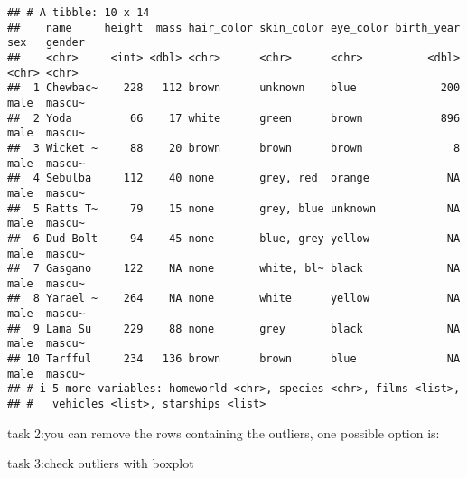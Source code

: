 \documentclass[
]{article}
\newenvironment{Shaded}{\begin{snugshade}}{\end{snugshade}}
\newcommand{\FunctionTok}[1]{\textcolor[rgb]{0.13,0.29,0.53}{\textbf{#1}}}
\newcommand{\NormalTok}[1]{#1}
\newcommand{\OtherTok}[1]{\textcolor[rgb]{0.56,0.35,0.01}{#1}}
\newcommand{\SpecialCharTok}[1]{\textcolor[rgb]{0.81,0.36,0.00}{\textbf{#1}}}
\begin{document}
\begin{Shaded}
\end{Shaded}

\begin{verbatim}
## # A tibble: 10 x 14
##    name     height  mass hair_color skin_color eye_color birth_year sex   gender
##    <chr>     <int> <dbl> <chr>      <chr>      <chr>          <dbl> <chr> <chr> 
##  1 Chewbac~    228   112 brown      unknown    blue             200 male  mascu~
##  2 Yoda         66    17 white      green      brown            896 male  mascu~
##  3 Wicket ~     88    20 brown      brown      brown              8 male  mascu~
##  4 Sebulba     112    40 none       grey, red  orange            NA male  mascu~
##  5 Ratts T~     79    15 none       grey, blue unknown           NA male  mascu~
##  6 Dud Bolt     94    45 none       blue, grey yellow            NA male  mascu~
##  7 Gasgano     122    NA none       white, bl~ black             NA male  mascu~
##  8 Yarael ~    264    NA none       white      yellow            NA male  mascu~
##  9 Lama Su     229    88 none       grey       black             NA male  mascu~
## 10 Tarfful     234   136 brown      brown      blue              NA male  mascu~
## # i 5 more variables: homeworld <chr>, species <chr>, films <list>,
## #   vehicles <list>, starships <list>
\end{verbatim}

task 2:you can remove the rows containing the outliers, one possible
option is:

\begin{Shaded}
\end{Shaded}

task 3:check outliers with boxplot

\begin{Shaded}
\end{Shaded}
\end{document}

